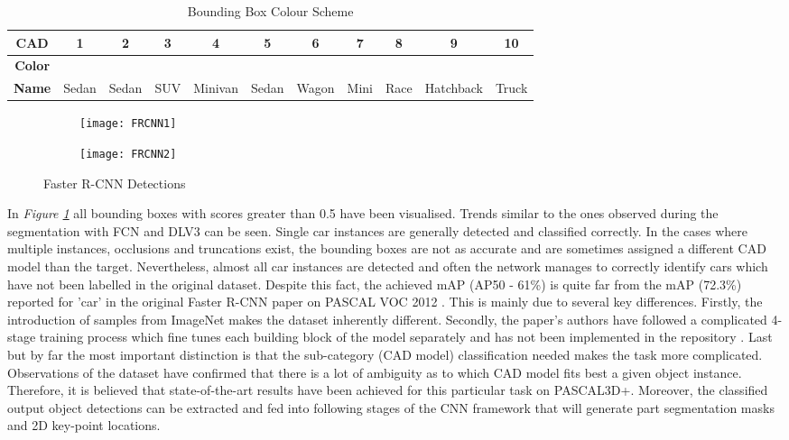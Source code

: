 \documentclass[main.tex]{subfiles}
\begin{document}
\begin{table}[h]
	\centering
	\begin{tabular}{| c || c | c | c | c | c | c | c | c | c | c |}
		\hline 
  		\textbf{CAD} & 1 & 2 & 3 & 4 & 5 & 6 & 7 & 8 & 9 & 10 \\
  		\hline
		\textbf{Color} & \cellcolor{Orange} & \cellcolor{LightBlue} & \cellcolor{Brown} & \cellcolor{Pink} & \cellcolor{DarkGreen} & \cellcolor{DarkBlue} & \cellcolor{LightGreen} & 						\cellcolor{Turquoise} & \cellcolor{sth1} & \cellcolor{sth2}\\
		\hline  		
   		\textbf{Name} & Sedan & Sedan & SUV & Minivan & Sedan & Wagon & Mini & Race & Hatchback & Truck \\
		\hline
	\end{tabular}	
\caption{Bounding Box Colour Scheme}
\label{tab:boxcolor}
\end{table}

\begin{figure}[H]
\centering
\begin{subfigure}[c]{0.5\textwidth}
\centering
\texttt{[image: FRCNN1]}
\end{subfigure}%
\begin{subfigure}[c]{0.5\textwidth}
\centering
\texttt{[image: FRCNN2]}
\end{subfigure}%
\caption{Faster R-CNN Detections}
\label{fig:faster_boxes}
\end{figure}

\indent In \emph{Figure \ref{fig:faster_boxes}} all bounding boxes with scores greater than 0.5 have been visualised. Trends similar to the ones observed during the segmentation with FCN and DLV3 can be seen. Single car instances are generally detected and classified correctly. In the cases where multiple instances, occlusions and truncations exist, the bounding boxes are not as accurate and are sometimes assigned a different CAD model than the target. Nevertheless, almost all car instances are detected and often the network manages to correctly identify cars which have not been labelled in the original dataset. Despite this fact, the achieved mAP (AP50 - 61\%) is quite far from the mAP (72.3\%) reported for 'car' in the original Faster R-CNN paper on PASCAL VOC 2012 \cite{Ren2017}. This is mainly due to several key differences. Firstly, the introduction of samples from ImageNet makes the dataset inherently different. Secondly, the paper's authors have followed a complicated 4-stage training process which fine tunes each building block of the model separately and has not been implemented in the repository \cite{massa2018mrcnn}. Last but by far the most important distinction is that the sub-category (CAD model) classification needed makes the task more complicated. Observations of the dataset have confirmed that there is a lot of ambiguity as to which CAD model fits best a given object instance. Therefore, it is believed that state-of-the-art results have been achieved for this particular task on PASCAL3D+. Moreover, the classified  output object detections can be extracted and fed into following stages of the CNN framework that will generate part segmentation masks and 2D key-point locations. 
\end{document}

